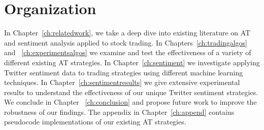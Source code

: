\documentclass[../thesis.tex]{subfiles}
\begin{document}
\section{Organization}

In Chapter~\ref{ch:relatedwork}, we take a deep dive into existing literature on AT and sentiment analysis applied to stock trading. In Chapters~\ref{ch:tradingalgos} and ~\ref{ch:experimentsalgos} we examine and test the effectiveness of a variety of different existing AT strategies. In Chapter~\ref{ch:sentiment} we investigate applying Twitter sentiment data to trading strategies using different machine learning techniques. In Chapter~\ref{ch:sentimentresults} we give extensive experimental results to understand the effectiveness of our unique Twitter sentiment strategies. We conclude in Chapter ~\ref{ch:conclusion} and propose future work to improve the robustness of our findings. The appendix in Chapter~\ref{ch:append} contains pseudocode implementations of our existing AT strategies.
\end{document}
